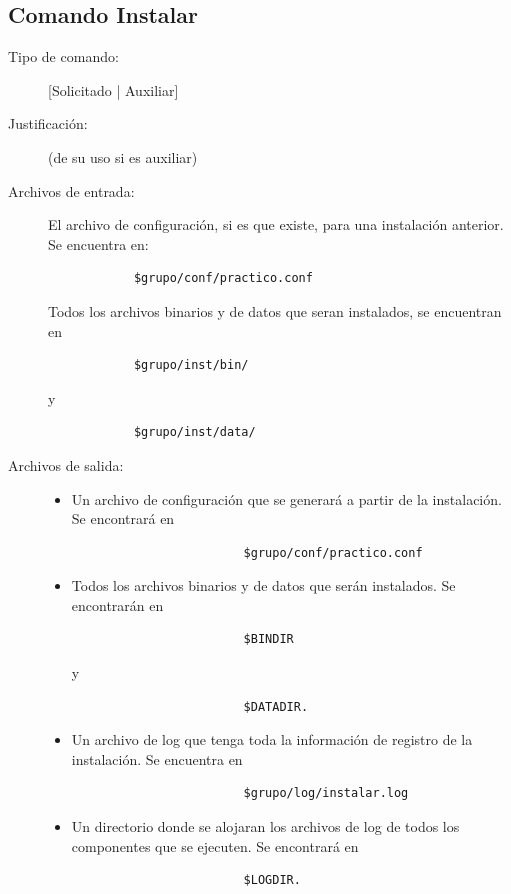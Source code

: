 \documentclass[12pt]{article}
\begin{document}
\subsection{Comando Instalar}
\begin{description}
	\item [Tipo de comando:] [Solicitado | Auxiliar]
	
	\item [Justificación:] (de su uso si es auxiliar)
	
	\item [Archivos de entrada:] 
		El archivo de configuración, si es que existe, para una instalación anterior. Se encuentra en:
		\begin{verbatim}
			$grupo/conf/practico.conf
		\end{verbatim}
		Todos los archivos binarios y de datos que seran instalados, se encuentran en 
		\begin{verbatim}
			$grupo/inst/bin/ 
		\end{verbatim}	
		y 
		\begin{verbatim}	
			$grupo/inst/data/
		\end{verbatim}
	
	
	\item [Archivos de salida:] 
		\begin{itemize}
			\item	Un archivo de configuración que se generará a partir de la instalación. Se encontrará en  
					\begin{verbatim}	
						$grupo/conf/practico.conf
					\end{verbatim}	
			\item Todos los archivos binarios y de datos que serán instalados. Se encontrarán en 
					\begin{verbatim}	
						$BINDIR 
					\end{verbatim}
					y 
					\begin{verbatim}	
						$DATADIR.
					\end{verbatim}
					
			\item	Un archivo de log que tenga toda la información de registro de la instalación. Se encuentra en 
					\begin{verbatim}
						$grupo/log/instalar.log
					\end{verbatim}
					
			\item	Un directorio donde se alojaran los archivos de log de todos los componentes que se ejecuten. Se encontrará en 
					\begin{verbatim}
						$LOGDIR.
					\end{verbatim}
		\end{itemize}
	

\end{description}
\end{document}
